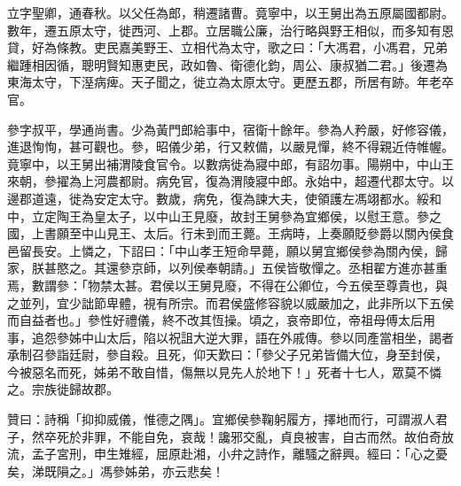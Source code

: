 \begin{pinyinscope}
立字聖卿，通春秋。以父任為郎，稍遷諸曹。竟寧中，以王舅出為五原屬國都尉。數年，遷五原太守，徙西河、上郡。立居職公廉，治行略與野王相似，而多知有恩貸，好為條教。吏民嘉美野王、立相代為太守，歌之曰：「大馮君，小馮君，兄弟繼踵相因循，聰明賢知惠吏民，政如魯、衛德化鈞，周公、康叔猶二君。」後遷為東海太守，下溼病痺。天子聞之，徙立為太原太守。更歷五郡，所居有跡。年老卒官。

參字叔平，學通尚書。少為黃門郎給事中，宿衛十餘年。參為人矜嚴，好修容儀，進退恂恂，甚可觀也。參，昭儀少弟，行又敕備，以嚴見憚，終不得親近侍帷幄。竟寧中，以王舅出補渭陵食官令。以數病徙為寢中郎，有詔勿事。陽朔中，中山王來朝，參擢為上河農都尉。病免官，復為渭陵寢中郎。永始中，超遷代郡太守。以邊郡道遠，徙為安定太守。數歲，病免，復為諫大夫，使領護左馮翊都水。綏和中，立定陶王為皇太子，以中山王見廢，故封王舅參為宜鄉侯，以慰王意。參之國，上書願至中山見王、太后。行未到而王薨。王病時，上奏願貶參爵以關內侯食邑留長安。上憐之，下詔曰：「中山孝王短命早薨，願以舅宜鄉侯參為關內侯，歸家，朕甚愍之。其還參京師，以列侯奉朝請。」五侯皆敬憚之。丞相翟方進亦甚重焉，數謂參：「物禁太甚。君侯以王舅見廢，不得在公卿位，今五侯至尊貴也，與之並列，宜少詘節卑體，視有所宗。而君侯盛修容貌以威嚴加之，此非所以下五侯而自益者也。」參性好禮儀，終不改其恆操。頃之，哀帝即位，帝祖母傅太后用事，追怨參姊中山太后，陷以祝詛大逆大罪，語在外戚傳。參以同產當相坐，謁者承制召參詣廷尉，參自殺。且死，仰天歎曰：「參父子兄弟皆備大位，身至封侯，今被惡名而死，姊弟不敢自惜，傷無以見先人於地下！」死者十七人，眾莫不憐之。宗族徙歸故郡。

贊曰：詩稱「抑抑威儀，惟德之隅」。宜鄉侯參鞠躬履方，擇地而行，可謂淑人君子，然卒死於非罪，不能自免，哀哉！讒邪交亂，貞良被害，自古而然。故伯奇放流，孟子宮刑，申生雉經，屈原赴湘，小弁之詩作，離騷之辭興。經曰：「心之憂矣，涕既隕之。」馮參姊弟，亦云悲矣！


\end{pinyinscope}